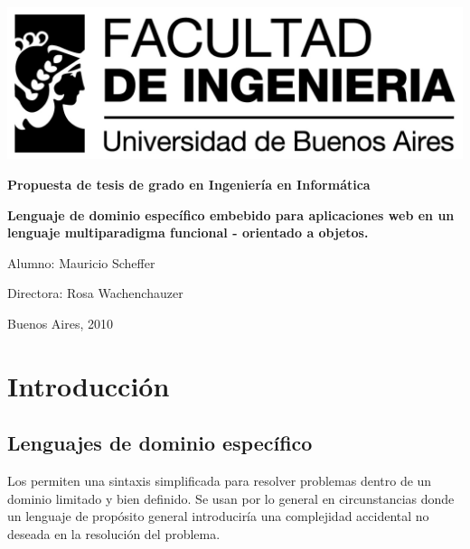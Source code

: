 \documentclass[12pt]{article}
\begin{document}
\thispagestyle{empty}

\begin {center}

\includegraphics[scale=1]{logo_fiuba_alta.jpg}


\vspace{3cm}

\textbf{\Large Propuesta de tesis de grado en Ingeniería en Informática}

\vspace{3cm}

\textbf{\Large Lenguaje de dominio específico embebido para aplicaciones web en un lenguaje multiparadigma funcional - orientado a objetos.}

\vspace{2cm}

\end {center}
\vspace{3cm}

Alumno: Mauricio Scheffer

Directora: Rosa Wachenchauzer

Buenos Aires, 2010

\newpage

\tableofcontents

\newpage

\section{Introducción}

\subsection{Lenguajes de dominio específico}

Los  permiten una sintaxis simplificada para resolver problemas dentro de un dominio limitado y bien definido. Se usan por lo general en circunstancias donde un lenguaje de propósito general introduciría una complejidad accidental no deseada en la resolución del problema. 
\end{document}

